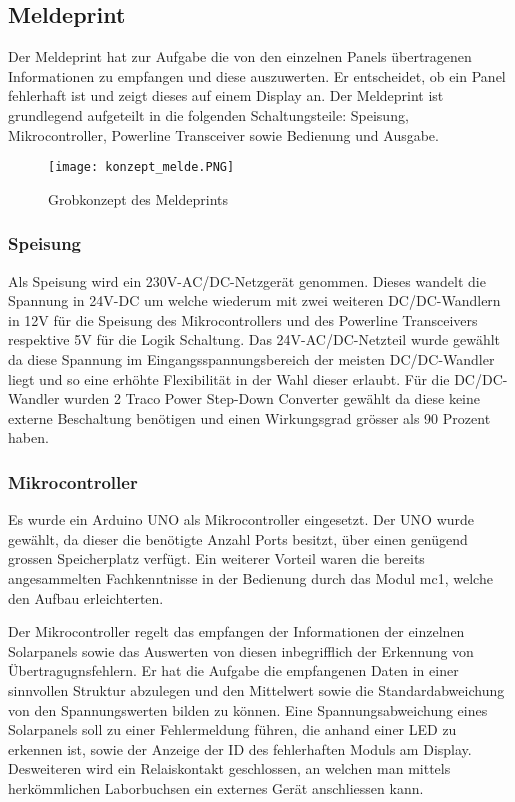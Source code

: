 \subsection{Meldeprint}
Der Meldeprint hat zur Aufgabe die von den einzelnen Panels übertragenen Informationen zu empfangen und diese auszuwerten. Er entscheidet, ob ein Panel fehlerhaft ist und zeigt dieses auf einem Display an. Der Meldeprint ist grundlegend aufgeteilt in die folgenden Schaltungsteile: Speisung, Mikrocontroller, Powerline Transceiver sowie Bedienung und Ausgabe.

\begin{figure}[h]
	\centering
	\texttt{[image: konzept\_melde.PNG]}
	\caption{Grobkonzept des Meldeprints}	
\end{figure}

\subsubsection{Speisung}
Als Speisung wird ein 230V-AC/DC-Netzgerät genommen. Dieses wandelt die Spannung in 24V-DC um welche wiederum mit zwei weiteren DC/DC-Wandlern in 12V für die Speisung des Mikrocontrollers und des Powerline Transceivers respektive 5V für die Logik Schaltung. Das 24V-AC/DC-Netzteil wurde gewählt da diese Spannung im Eingangsspannungsbereich der meisten DC/DC-Wandler liegt und so eine erhöhte Flexibilität in der Wahl dieser erlaubt. Für die DC/DC-Wandler wurden 2 Traco Power Step-Down Converter gewählt da diese keine externe Beschaltung benötigen und einen Wirkungsgrad grösser als 90 Prozent haben.

\subsubsection{Mikrocontroller}
Es wurde ein Arduino UNO als Mikrocontroller eingesetzt. Der UNO wurde gewählt, da dieser die benötigte Anzahl Ports besitzt, über einen genügend grossen Speicherplatz verfügt. Ein weiterer Vorteil waren die bereits angesammelten Fachkenntnisse in der Bedienung durch das Modul mc1, welche den Aufbau erleichterten.

Der Mikrocontroller regelt das empfangen der Informationen der einzelnen Solarpanels sowie das Auswerten von diesen inbegrifflich der Erkennung von Übertragugnsfehlern. Er hat die Aufgabe die empfangenen Daten in einer sinnvollen Struktur abzulegen und den Mittelwert sowie die Standardabweichung von den Spannungswerten bilden zu können. Eine Spannungsabweichung eines Solarpanels soll zu einer Fehlermeldung führen, die anhand einer LED zu erkennen ist, sowie der Anzeige der ID des fehlerhaften Moduls am Display. Desweiteren wird ein Relaiskontakt geschlossen, an welchen man mittels herkömmlichen Laborbuchsen ein externes Gerät anschliessen kann.

